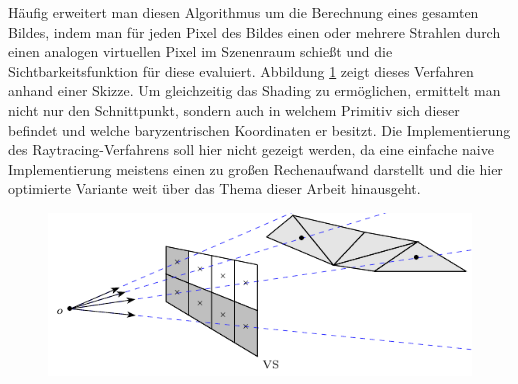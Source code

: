 		Häufig erweitert man diesen Algorithmus um die Berechnung eines gesamten Bildes, indem man für jeden Pixel des Bildes einen oder mehrere Strahlen durch einen analogen virtuellen Pixel im Szenenraum schießt und die Sichtbarkeitsfunktion für diese evaluiert.
		Abbildung \ref{fig:ray_tracing-2} zeigt dieses Verfahren anhand einer Skizze.
		Um gleichzeitig das Shading zu ermöglichen, ermittelt man nicht nur den Schnittpunkt, sondern auch in welchem Primitiv sich dieser befindet und welche baryzentrischen Koordinaten er besitzt.
		Die Implementierung des Raytracing-Verfahrens soll hier nicht gezeigt werden, da eine einfache naive Implementierung meistens einen zu großen Rechenaufwand darstellt und die hier optimierte Variante weit über das Thema dieser Arbeit hinausgeht.

		\begin{figure}[h]
			\center
			\includegraphics{gg_fig/ray_tracing_2.pdf}
			\caption{}
			\label{fig:ray_tracing-2}
		\end{figure}


